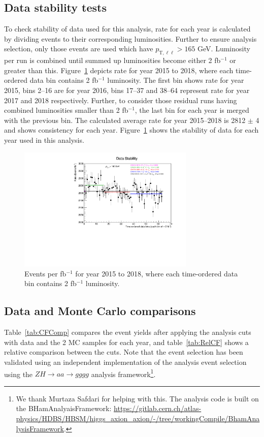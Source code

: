 \subsection{Data stability tests}
To check stability of data used for this analysis, rate for each year is calculated by dividing events to their corresponding luminosities. Further to ensure analysis selection, only those events are used which have $p_{\text{T},\ell\ell}>165$ GeV. Luminosity per run is combined until summed up luminosities become either 2 fb$^{-1}$ or greater than this. Figure~\ref{fig:DataStability} depicts rate for year 2015 to 2018, where each time-ordered data bin contains 2 fb$^{-1}$ luminosity. The first bin shows rate for year 2015, bins 2--16 are for year 2016, bins 17--37 and 38--64 represent rate for year 2017 and 2018 respectively. Further, to consider those residual runs having combined luminosities smaller than 2 fb$^{-1}$, the last bin for each year is merged with the previous bin. The calculated average rate for year 2015--2018 is 2812 $\pm$ 4 and shows consistency for each year. Figure~\ref{fig:DataStability} shows the stability of data for each year used in this analysis.
\begin{figure}[h!]
\centering
\includegraphics[width=0.75\textwidth]{figures/DataStability.pdf}
\caption{Events per fb$^{-1}$ for year 2015 to 2018, where each time-ordered data bin contains 2 fb$^{-1}$ luminosity.}
\label{fig:DataStability}
\end{figure}

\subsection{Data and Monte Carlo comparisons}
\label{sec:datamc}

Table~\ref{tab:CFComp} compares the event yields after applying the analysis cuts with data and the 2 MC samples for each year, and table~\ref{tab:RelCF} shows a relative comparison between the cuts.  Note that the event selection has been validated using an independent implementation of the analysis event selection using the $ZH\rightarrow aa\rightarrow gggg$ analysis framework\footnote{We thank Murtaza Safdari for helping with this.  The analysis code is built on the BHamAnalyaisFramework: \url{https://gitlab.cern.ch/atlas-physics/HDBS/HBSM/higgs_axion_axion/-/tree/workingCompile/BhamAnalysisFramework}.}.

